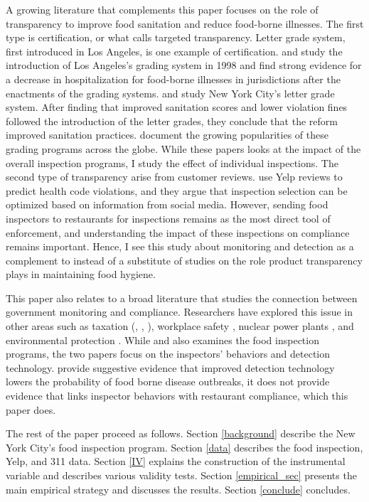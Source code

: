 \documentclass[12pt]{article}
\begin{document}
A growing literature that complements this paper focuses on the role of transparency to improve food sanitation and reduce food-borne illnesses. The first type is certification, or what \cite{Ho_2012} calls targeted transparency. Letter grade system, first introduced in Los Angeles, is one example of certification. \cite{jie_leslie_05} and \cite{Simon_05} study the introduction of Los Angeles's grading system in 1998 and find strong evidence for a decrease in hospitalization for food-borne illnesses in jurisdictions after the enactments of the grading systems. \cite{Wong_at_el_2015} and \cite{Meltzer_2015} study New York City's letter grade system. After finding that improved sanitation scores and lower violation fines followed the introduction of the letter grades, they conclude that the reform improved sanitation practices. \cite{Filion_Powell_09} document the growing popularities of these grading programs across the globe. While these papers looks at the impact of the overall inspection programs, I study the effect of individual inspections. The second type of transparency arise from customer reviews. \cite{Luca_13} use Yelp reviews to predict health code violations, and they argue that inspection selection can be optimized based on information from social media. However, sending food inspectors to restaurants for inspections remains as the most direct tool of enforcement, and understanding the impact of these inspections on compliance remains important. Hence, I see this study about monitoring and detection as a complement to instead of a substitute of studies on the role product transparency plays in maintaining food hygiene.

This paper also relates to a broad literature that studies the connection between government monitoring and compliance. Researchers have explored this issue in other areas such as taxation (\cite{Feinstein_91}, \cite{Kleven_etal_10}, \cite{Gemmell_Ratto_12}), workplace safety \citep{levine_etal_12}, nuclear power plants \citep{Feinstein_89}, and environmental protection \citep{Duflo_Greenstone_14}. While \cite{Jin_Lee_12} and \cite{Jin_Lee_14} also examines the food inspection programs, the two papers focus on the inspectors' behaviors and detection technology. \cite{Jin_Lee_14} provide suggestive evidence that improved detection technology lowers the probability of food borne disease outbreaks, it does not provide evidence that links inspector behaviors with restaurant compliance, which this paper does.

The rest of the paper proceed as follows. Section \ref{background} describe the New York City's food inspection program. Section \ref{data} describes the food inspection, Yelp, and 311 data. Section \ref{IV} explains the construction of the instrumental variable and describes various validity tests. Section \ref{empirical_sec} presents the main empirical strategy and discusses the results. Section \ref{conclude} concludes.
\end{document}
